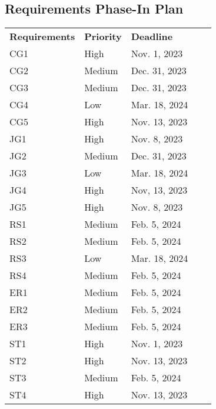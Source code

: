 \documentclass[12pt]{article}
\begin{document}
\subsection{Requirements Phase-In Plan}
\begin{table}[H]
\centering
\begin{tabular}{|l|l|l|ll}
\cline{1-3}
\textbf{Requirements} & \textbf{Priority} & \textbf{Deadline} &  &  \\ \cline{1-3}
CG1          & High     & Nov. 1, 2023      &  &  \\ \cline{1-3}
CG2          & Medium      & Dec. 31, 2023     &  &  \\ \cline{1-3}
CG3         & Medium     & Dec. 31, 2023      &  &  \\ \cline{1-3}
CG4          & Low   & Mar. 18, 2024      &  &  \\ \cline{1-3}
CG5          & High      & Nov. 13, 2023      &  &  \\ \cline{1-3}
JG1          & High     & Nov. 8, 2023     &  &  \\ \cline{1-3}
JG2          & Medium     & Dec. 31, 2023     &  &  \\ \cline{1-3}
JG3         &  Low   & Mar. 18, 2024      &  &  \\ \cline{1-3}
JG4          & High      & Nov, 13, 2023     &  &  \\ \cline{1-3}
JG5         & High      & Nov. 8, 2023      &  &  \\ \cline{1-3}
RS1         & Medium     & Feb. 5, 2024     &  &  \\ \cline{1-3}
RS2        & Medium     & Feb. 5, 2024     &  &  \\ \cline{1-3}
RS3        & Low     & Mar. 18, 2024     &  &  \\ \cline{1-3}
RS4        & Medium     & Feb. 5, 2024      &  &  \\ \cline{1-3}
ER1         & Medium     & Feb. 5, 2024     &  &  \\ \cline{1-3}
ER2         & Medium      & Feb. 5, 2024      &  &  \\ \cline{1-3}
ER3         & Medium     & Feb. 5, 2024      &  &  \\ \cline{1-3}
ST1         & High     & Nov. 1, 2023     &  &  \\ \cline{1-3}
ST2         & High     & Nov. 13, 2023     &  &  \\ \cline{1-3}
ST3        & Medium   & Feb. 5, 2024      &  &  \\ \cline{1-3}
ST4         & High   & Nov. 13, 2023      &  &  \\ \cline{1-3}

\end{tabular}
\end{table}
\end{document}
